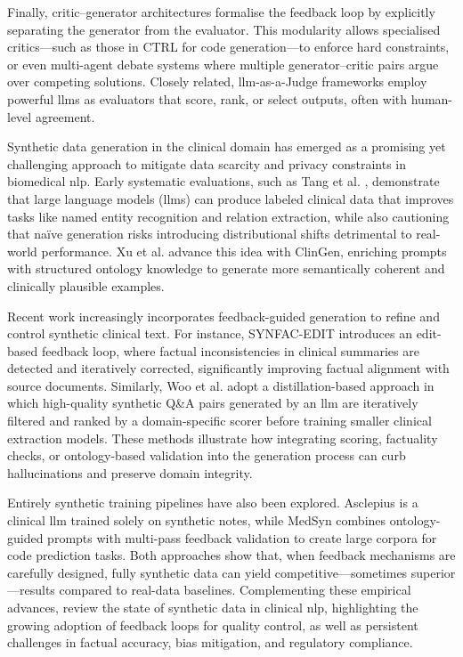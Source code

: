 Finally, critic–generator architectures formalise the feedback loop by explicitly separating the generator from the evaluator. This modularity allows specialised critics—such as those in CTRL \citep{zhang2024ctrl} for code generation—to enforce hard constraints, or even multi-agent debate systems where multiple generator–critic pairs argue over competing solutions. Closely related, \gls{llm}-as-a-Judge frameworks \citep{liu2023geval,fu2023gptscore} employ powerful \glspl{llm} as evaluators that score, rank, or select outputs, often with human-level agreement.

Synthetic data generation in the clinical domain has emerged as a promising yet challenging approach to mitigate data scarcity and privacy constraints in biomedical \gls{nlp}. Early systematic evaluations, such as Tang et al. \citep{tang2023synthetic_clinical_llm}, demonstrate that large language models (\glspl{llm}) can produce labeled clinical data that improves tasks like named entity recognition and relation extraction, while also cautioning that naïve generation risks introducing distributional shifts detrimental to real-world performance. Xu et al. \citep{xu2023clingen} advance this idea with ClinGen, enriching prompts with structured ontology knowledge to generate more semantically coherent and clinically plausible examples.

Recent work increasingly incorporates feedback-guided generation to refine and control synthetic clinical text. For instance, SYNFAC-EDIT \citep{miller2024synfacedit} introduces an edit-based feedback loop, where factual inconsistencies in clinical summaries are detected and iteratively corrected, significantly improving factual alignment with source documents. Similarly, Woo et al. \citep{woo2025synthetic} adopt a distillation-based approach in which high-quality synthetic Q\&A pairs generated by an \gls{llm} are iteratively filtered and ranked by a domain-specific scorer before training smaller clinical extraction models. These methods illustrate how integrating scoring, factuality checks, or ontology-based validation into the generation process can curb hallucinations and preserve domain integrity.

Entirely synthetic training pipelines have also been explored. Asclepius \citep{kweon2024asclepius} is a clinical \gls{llm} trained solely on synthetic notes, while MedSyn \citep{kumichev2024medsyn} combines ontology-guided prompts with multi-pass feedback validation to create large corpora for code prediction tasks. Both approaches show that, when feedback mechanisms are carefully designed, fully synthetic data can yield competitive—sometimes superior—results compared to real-data baselines. Complementing these empirical advances, \citet{rao2025scoping_synthetic_clinical} review the state of synthetic data in clinical \gls{nlp}, highlighting the growing adoption of feedback loops for quality control, as well as persistent challenges in factual accuracy, bias mitigation, and regulatory compliance.

